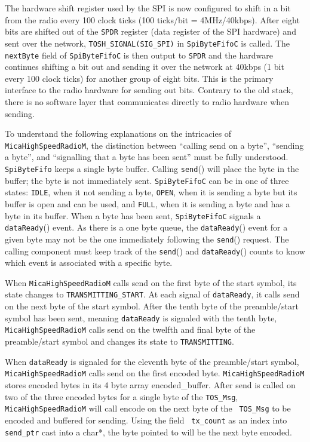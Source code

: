 \documentclass[11pt]{article}
\begin{document}
The hardware shift register used by the SPI is now configured to shift
in a bit from the radio every 100 clock ticks (100 ticks/bit =
4MHz/40kbps). After eight bits are shifted out of the {\tt SPDR} register
(data register of the SPI hardware) and sent over the network,
{\tt TOSH\_SIGNAL(SIG\_SPI)} in {\tt SpiByteFifoC} is called. The {\tt nextByte}
field of {\tt SpiByteFifoC} is then output to {\tt SPDR} and the hardware
continues shifting a bit out and sending it over the network at 40kbps
(1 bit every 100 clock ticks) for another group of eight bits. This is
the primary interface to the radio hardware for sending out
bits. Contrary to the old stack, there is no software layer that
communicates directly to radio hardware when sending.

To understand the following explanations on the intricacies of
{\tt MicaHighSpeedRadioM}, the distinction between ``calling send on a
byte'', ``sending a byte'', and ``signalling that a byte has been
sent'' must be fully understood.  {\tt SpiByteFifo} keeps a single byte
buffer. Calling {\tt send}() will place the byte in the buffer; the byte is
not immediately sent. {\tt SpiByteFifoC} can be in one of three states: {\tt IDLE},
when it not sending a byte, {\tt OPEN}, when it is sending a byte but its
buffer is open and can be used, and {\tt FULL}, when it is sending a byte
and has a byte in its buffer. When a byte has been sent, {\tt SpiByteFifoC}
signals a {\tt dataReady}() event. As there is a one byte queue, the
{\tt dataReady}() event for a given byte may not be the one immediately
following the {\tt send}() request. The calling component must keep track of
the {\tt send}() and {\tt dataReady}() counts to know which event is associated
with a specific byte.

When {\tt MicaHighSpeedRadioM} calls send on the first byte of the start symbol, its
state changes to {\tt TRANSMITTING\_START}. At each signal of {\tt dataReady}, it
calls send on the next byte of the start symbol.  After the tenth byte
of the preamble/start symbol has been sent, meaning {\tt dataReady} is
signaled with the tenth byte, {\tt MicaHighSpeedRadioM} calls send on the twelfth
and final byte of the preamble/start symbol and changes its state to
{\tt TRANSMITTING}.

When {\tt dataReady} is signaled for the eleventh byte of the
preamble/start symbol, \\
{\tt MicaHighSpeedRadioM} calls send on the
first encoded byte.  {\tt MicaHighSpeedRadioM} stores encoded bytes in
its 4 byte array encoded\_buffer. After send is called on two of the
three encoded bytes for a single byte of the {\tt TOS\_Msg}, {\tt
MicaHighSpeedRadioM} will call encode on the next byte of the {\tt
TOS\_Msg} to be encoded and buffered for sending. Using the field {\tt
tx\_count} as an index into {\tt send\_ptr} cast into a char*, the
byte pointed to will be the next byte encoded.
\end{document}
